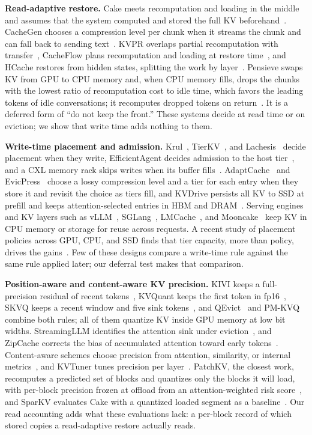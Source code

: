 \documentclass[conference]{IEEEtran}
\begin{document}
\textbf{Read-adaptive restore.}
Cake meets recomputation and loading in the middle and assumes that the system computed and stored the full KV beforehand~\cite{cake2025}.
CacheGen chooses a compression level per chunk when it streams the chunk and can fall back to sending text~\cite{cachegen2024}.
KVPR overlaps partial recomputation with transfer~\cite{kvpr2025}, CacheFlow plans recomputation and loading at restore time~\cite{cacheflow2026}, and HCache restores from hidden states, splitting the work by layer~\cite{hcache2025}.
Pensieve swaps KV from GPU to CPU memory and, when CPU memory fills, drops the chunks with the lowest ratio of recomputation cost to idle time, which favors the leading tokens of idle conversations; it recomputes dropped tokens on return~\cite{pensieve2025}.
It is a deferred form of ``do not keep the front.''
These systems decide at read time or on eviction; we show that write time adds nothing to them.

\textbf{Write-time placement and admission.}
Krul~\cite{krul2025}, TierKV~\cite{tierkv2026}, and Lachesis~\cite{lachesis2026} decide placement when they write, EfficientAgent decides admission to the host tier~\cite{efficientagent2026}, and a CXL memory rack skips writes when its buffer fills~\cite{hymcache2026}.
AdaptCache~\cite{adaptcache2025} and EvicPress~\cite{evicpress2025} choose a lossy compression level and a tier for each entry when they store it and revisit the choice as tiers fill, and KVDrive persists all KV to SSD at prefill and keeps attention-selected entries in HBM and DRAM~\cite{kvdrive2026}.
Serving engines and KV layers such as vLLM~\cite{vllm2023}, SGLang~\cite{sglang2024}, LMCache~\cite{lmcache2025}, and Mooncake~\cite{mooncake2025} keep KV in CPU memory or storage for reuse across requests.
A recent study of placement policies across GPU, CPU, and SSD finds that tier capacity, more than policy, drives the gains~\cite{wherekvlive2026}.
Few of these designs compare a write-time rule against the same rule applied later; our deferral test makes that comparison.

\textbf{Position-aware and content-aware KV precision.}
KIVI keeps a full-precision residual of recent tokens~\cite{kivi2024}, KVQuant keeps the first token in fp16~\cite{kvquant2024}, SKVQ keeps a recent window and five sink tokens~\cite{skvq2024}, and QEvict~\cite{qevict2026} and PM-KVQ~\cite{pmkvq2025} combine both rules; all of them quantize KV inside GPU memory at low bit widths.
StreamingLLM identifies the attention sink under eviction~\cite{streamingllm2024}, and ZipCache corrects the bias of accumulated attention toward early tokens~\cite{zipcache2024}.
Content-aware schemes choose precision from attention, similarity, or internal metrics~\cite{diffkv2025,cocktail2025,semkv2026}, and KVTuner tunes precision per layer~\cite{kvtuner2025}.
PatchKV, the closest work, recomputes a predicted set of blocks and quantizes only the blocks it will load, with per-block precision frozen at offload from an attention-weighted risk score~\cite{patchkv2026}, and SparKV evaluates Cake with a quantized loaded segment as a baseline~\cite{sparkv2026}.
Our read accounting adds what these evaluations lack: a per-block record of which stored copies a read-adaptive restore actually reads.
\end{document}
